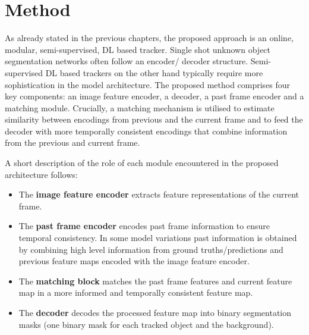 \chapter{Method}\label{chapter:method}


As already stated in the previous chapters, the proposed approach is an online, modular, semi-supervised, DL based tracker. Single shot unknown object segmentation networks often follow an encoder/ decoder structure. Semi-supervised DL based trackers on the other hand typically require more sophistication in the model architecture. 
The proposed method comprises four key components: an image feature encoder, a decoder, a past frame encoder and a matching module. 
Crucially, a matching mechanism is utilised to estimate similarity between encodings from previous and the current frame and to feed the decoder with more temporally consistent encodings that combine information from the previous and current frame. \par

A short description of the role of each module encountered in the proposed architecture follows:

\begin{itemize}
    \item The \textbf{image feature encoder} extracts feature representations of the current frame. 
    \item The \textbf{past frame encoder} 
    encodes past frame information to ensure temporal consistency. In some model variations past information is obtained by combining high level information from ground truths/predictions and previous feature maps encoded with the image feature encoder.
    \item The \textbf{matching block} matches the past frame features and current feature map in a more informed and temporally consistent feature map. 
    \item The \textbf{decoder} decodes the processed feature map into binary segmentation masks (one binary mask for each tracked object and the background). 

\end{itemize}


